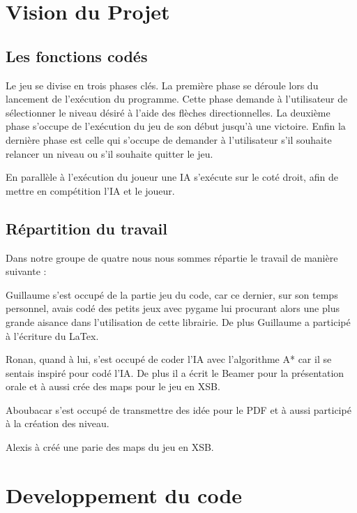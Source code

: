 \documentclass[a4paper,12pt]{article} %
\begin{document}
\newpage

\section{Vision du Projet}

\subsection{Les fonctions codés}

Le jeu se divise en trois phases clés.
La première phase se déroule lors du lancement de l'exécution du programme.
Cette phase demande à l'utilisateur de sélectionner le niveau désiré à l'aide des flèches directionnelles.
La deuxième phase s'occupe de l'exécution du jeu de son début jusqu'à une victoire.
Enfin la dernière phase est celle qui s'occupe de demander à l'utilisateur s'il souhaite relancer un niveau ou s'il souhaite quitter le jeu.

En parallèle à l'exécution du joueur une IA s'exécute  sur le coté droit, afin de mettre en compétition l'IA et le joueur.

\subsection{Répartition du travail}

Dans notre groupe de quatre nous nous sommes répartie le travail de manière suivante : 

Guillaume s'est occupé de la partie jeu du code, car ce dernier, sur son temps personnel, avais codé des petits jeux avec pygame lui procurant alors une plus grande aisance dans l'utilisation de cette librairie.
De plus Guillaume a participé à l'écriture du LaTex.

Ronan, quand à lui, s'est occupé de coder l'IA avec l'algorithme A* car il se sentais inspiré pour codé l'IA.
De plus il a écrit le Beamer pour la présentation orale et à aussi crée des maps pour le jeu en XSB.

Aboubacar s'est occupé de transmettre des idée pour le PDF et à aussi participé à la création des niveau.

Alexis à créé une parie des maps du jeu en XSB.

\newpage

\section{Developpement du code}
\end{document}
